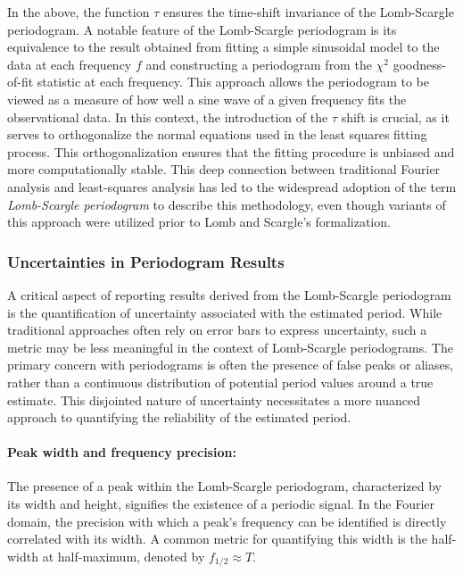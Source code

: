     			In the above, the function $\tau$ ensures the time-shift invariance of the Lomb-Scargle periodogram. A notable feature of the Lomb-Scargle periodogram is its equivalence to the result obtained from fitting a simple sinusoidal model to the data at each frequency $f$ and constructing a periodogram from the $\chi^2$ goodness-of-fit statistic at each frequency. This approach allows the periodogram to be viewed as a measure of how well a sine wave of a given frequency fits the observational data. In this context, the introduction of the $\tau$ shift is crucial, as it serves to orthogonalize the normal equations used in the least squares fitting process. This orthogonalization ensures that the fitting procedure is unbiased and more computationally stable. This deep connection between traditional Fourier analysis and least-squares analysis has led to the widespread adoption of the term \textit{Lomb-Scargle periodogram} to describe this methodology, even though variants of this approach were utilized prior to Lomb and Scargle's formalization.
    			
    		\subsubsection{Uncertainties in Periodogram Results}
    			A critical aspect of reporting results derived from the Lomb-Scargle periodogram is the quantification of uncertainty associated with the estimated period. While traditional approaches often rely on error bars to express uncertainty, such a metric may be less meaningful in the context of Lomb-Scargle periodograms. The primary concern with periodograms is often the presence of false peaks or aliases, rather than a continuous distribution of potential period values around a true estimate. This disjointed nature of uncertainty necessitates a more nuanced approach to quantifying the reliability of the estimated period.
    			
    			\paragraph{Peak width and frequency precision:}
    			The presence of a peak within the Lomb-Scargle periodogram, characterized by its width and height, signifies the existence of a periodic signal. In the Fourier domain, the precision with which a peak's frequency can be identified is directly correlated with its width. A common metric for quantifying this width is the half-width at half-maximum, denoted by $f_{1/2}\approx T$.
    			
